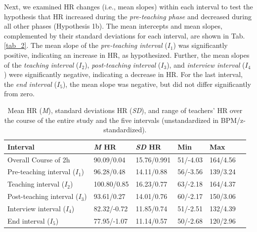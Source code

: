 \documentclass[preprint,
3p]{elsarticle} %
\begin{document}
Next, we examined HR changes (i.e., mean slopes) within each interval to
test the hypothesis that HR increased during the \emph{pre-teaching
phase} and decreased during all other phases (Hypothesis 1b). The mean
intercepts and mean slopes, complemented by their standard deviations
for each interval, are shown in Tab.\ref{tab_2}. The mean slope of the
\emph{pre-teaching interval} (\(I_1\)) was significantly positive,
indicating an increase in HR, as hypothesized. Further, the mean slopes
of the \emph{teaching interval} (\(I_2\)), \emph{post-teaching interval}
(\(I_3\)), and \emph{interview interval} (\(I_4\)) were significantly
negative, indicating a decrease in HR. For the last interval, the
\emph{end interval} (\(I_5\)), the mean slope was negative, but did not
differ significantly from zero.

\renewcommand{\arraystretch}{1.5}

\begin{table}[ht]
    \centering
    \begin{tabularx}{\textwidth}{lXXXXX}
        \toprule
        Interval & \textit{M} HR & \textit{SD} HR & Min & Max \\
        \midrule
        Overall Course of 2h & 90.09/0.04\footnotemark[12] & 15.76/0.991 & 51/-4.03 & 164/4.56 \\
        Pre-teaching interval ($I_1$) & 96.28/0.48 & 14.11/0.88 & 56/-3.56 & 139/3.24 \\
        Teaching interval ($I_2$) & 100.80/0.85 & 16.23/0.77 & 63/-2.18 & 164/4.37 \\
        Post-teaching interval ($I_3$) & 93.61/0.27 & 14.01/0.76 & 60/-2.17 & 150/3.06 \\
        Interview interval ($I_4$) & 82.32/-0.72 & 11.85/0.74 & 51/-2.51 & 132/4.39 \\
        End interval ($I_5$) & 77.95/-1.07 & 11.14/0.57 & 50\footnotemark[13]/-2.68 & 120/2.96 \\
        \bottomrule
    \end{tabularx}
    \caption{Mean HR (\textit{M}), standard deviations HR (\textit{SD}), and range of teachers’ HR over the course of the entire study and the five intervals (unstandardized in BPM/z-standardized).}
    \label{tab_1}

    
\end{table}
\end{document}
